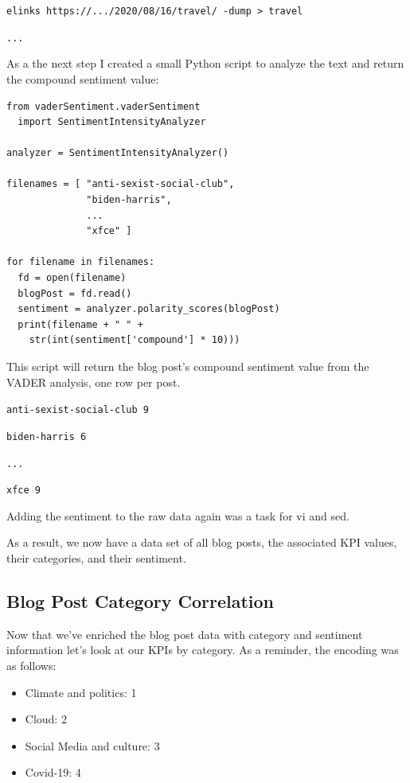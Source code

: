 \verb|elinks https://.../2020/08/16/travel/ -dump > travel|

\verb|...|

As a the next step I created a small Python script to analyze the text and return the compound sentiment value:

\begin{lstlisting}[caption=Vader Sentiment Compound, frame=single, basicstyle=\ttfamily]
from vaderSentiment.vaderSentiment 
  import SentimentIntensityAnalyzer

analyzer = SentimentIntensityAnalyzer()

filenames = [ "anti-sexist-social-club",
              "biden-harris",
              ...
              "xfce" ]

for filename in filenames:
  fd = open(filename)
  blogPost = fd.read()
  sentiment = analyzer.polarity_scores(blogPost)
  print(filename + " " + 
    str(int(sentiment['compound'] * 10)))

\end{lstlisting}

This script will return the blog post's compound sentiment value from the VADER analysis, one row per post.

\verb|anti-sexist-social-club 9|

\verb|biden-harris 6|

\verb|...|

\verb|xfce 9|

Adding the sentiment to the raw data again was a task for vi and sed.

As a result, we now have a data set of all blog posts, the associated KPI values, their categories, and their sentiment.

\subsection{Blog Post Category Correlation}

Now that we've enriched the blog post data with category and sentiment information let's look at our KPIs by category. As a reminder, the encoding was as follows:

\begin{itemize}
\item Climate and politics: 1
\item Cloud: 2
\item Social Media and culture: 3
\item Covid-19: 4
\end{itemize}

